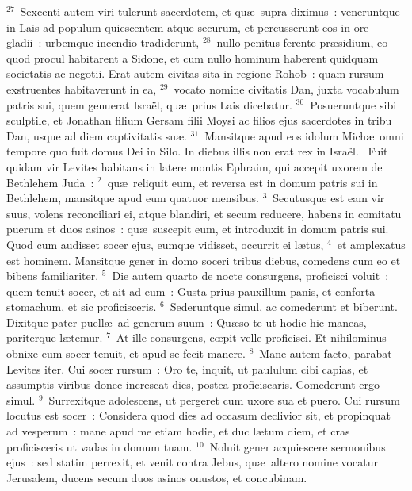 ${}^{27}$~Sexcenti autem viri tulerunt sacerdotem, et qu\ae\ supra diximus~: veneruntque in Lais ad populum quiescentem atque securum, et percusserunt eos in ore gladii~: urbemque incendio tradiderunt,
${}^{28}$~nullo penitus ferente pr\ae sidium, eo quod procul habitarent a Sidone, et cum nullo hominum haberent quidquam societatis ac negotii. Erat autem civitas sita in regione Rohob~: quam rursum exstruentes habitaverunt in ea,
${}^{29}$~vocato nomine civitatis Dan, juxta vocabulum patris sui, quem genuerat Isra\"el, qu\ae\ prius Lais dicebatur.
${}^{30}$~Posueruntque sibi sculptile, et Jonathan filium Gersam filii Moysi ac filios ejus sacerdotes in tribu Dan, usque ad diem captivitatis su\ae .
${}^{31}$~Mansitque apud eos idolum Mich\ae\ omni tempore quo fuit domus Dei in Silo. In diebus illis non erat rex in Isra\"el.
~Fuit quidam vir Levites habitans in latere montis Ephraim, qui accepit uxorem de Bethlehem Juda~:
${}^{2}$~qu\ae\ reliquit eum, et reversa est in domum patris sui in Bethlehem, mansitque apud eum quatuor mensibus.
${}^{3}$~Secutusque est eam vir suus, volens reconciliari ei, atque blandiri, et secum reducere, habens in comitatu puerum et duos asinos~: qu\ae\ suscepit eum, et introduxit in domum patris sui. Quod cum audisset socer ejus, eumque vidisset, occurrit ei l\ae tus,
${}^{4}$~et amplexatus est hominem. Mansitque gener in domo soceri tribus diebus, comedens cum eo et bibens familiariter.
${}^{5}$~Die autem quarto de nocte consurgens, proficisci voluit~: quem tenuit socer, et ait ad eum~: Gusta prius pauxillum panis, et conforta stomachum, et sic proficisceris.
${}^{6}$~Sederuntque simul, ac comederunt et biberunt. Dixitque pater puell\ae\ ad generum suum~: Qu\ae so te ut hodie hic maneas, pariterque l\ae temur.
${}^{7}$~At ille consurgens, cœpit velle proficisci. Et nihilominus obnixe eum socer tenuit, et apud se fecit manere.
${}^{8}$~Mane autem facto, parabat Levites iter. Cui socer rursum~: Oro te, inquit, ut paululum cibi capias, et assumptis viribus donec increscat dies, postea proficiscaris. Comederunt ergo simul.
${}^{9}$~Surrexitque adolescens, ut pergeret cum uxore sua et puero. Cui rursum locutus est socer~: Considera quod dies ad occasum declivior sit, et propinquat ad vesperum~: mane apud me etiam hodie, et duc l\ae tum diem, et cras proficisceris ut vadas in domum tuam.
${}^{10}$~Noluit gener acquiescere sermonibus ejus~: sed statim perrexit, et venit contra Jebus, qu\ae\ altero nomine vocatur Jerusalem, ducens secum duos asinos onustos, et concubinam.


